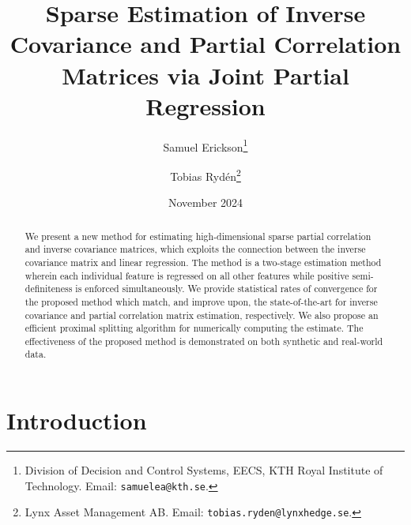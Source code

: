 \documentclass{article}
\title{Sparse Estimation of Inverse Covariance and Partial Correlation Matrices via Joint Partial Regression}
\author{Samuel Erickson\footnote{Division of Decision and Control Systems, EECS, KTH Royal Institute of Technology. Email: \texttt{samuelea@kth.se}.} \and Tobias Rydén\footnote{Lynx Asset Management AB. Email: \texttt{tobias.ryden@lynxhedge.se}.}}
\date{November 2024}
\begin{document}
\maketitle


\begin{abstract}%
We present a new method for estimating high-dimensional sparse partial
correlation and inverse covariance matrices, which exploits the connection
between the inverse covariance matrix and linear regression. The method is a
two-stage estimation method wherein each individual feature is regressed on all
other features while positive semi-definiteness is enforced simultaneously. We
provide statistical rates of convergence for the proposed method which match,
and improve upon, the state-of-the-art for inverse covariance and partial
correlation matrix estimation, respectively. We also propose an efficient
proximal splitting algorithm for numerically computing the estimate. The
effectiveness of the proposed method is demonstrated on both synthetic and
real-world data. 
\end{abstract}

 

\section{Introduction}
\end{document}
